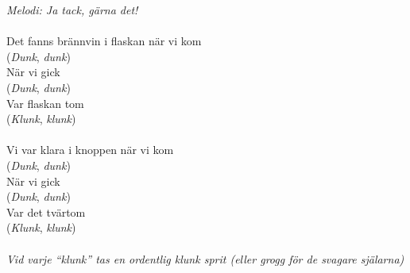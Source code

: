 {\footnotesize\textit{Melodi: Ja tack, gärna det!}}\\
\\
Det fanns brännvin i flaskan när vi kom\\
(\textit{Dunk}, \textit{dunk})\\
När vi gick\\
(\textit{Dunk}, \textit{dunk})\\
Var flaskan tom\\
(\textit{Klunk}, \textit{klunk})\\
\\
Vi var klara i knoppen när vi kom\\
(\textit{Dunk}, \textit{dunk})\\
När vi gick\\
(\textit{Dunk}, \textit{dunk})\\
Var det tvärtom\\
(\textit{Klunk}, \textit{klunk})\\
\\
{\footnotesize\textit{Vid varje ``klunk'' tas en ordentlig klunk sprit (eller grogg för de svagare själarna)}}
